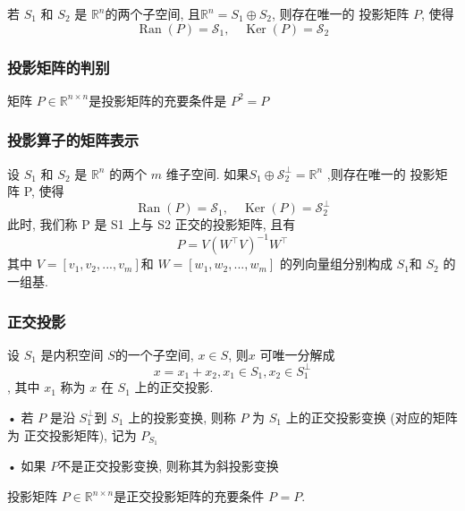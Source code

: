 \documentclass[12pt,a4paper]{article}
\begin{document}
\begin{framed}
	\begin{lemma}
		若 $S_1$ 和 $S_2$ 是 $\mathbb{R}^n$的两个子空间, 且$ \mathbb{R}^n= S_1 ⊕ S_2$, 则存在唯一的
		投影矩阵 $P$, 使得
		$$
		\operatorname{Ran}(P)=\mathcal{S}_{1}, \quad \operatorname{Ker}(P)=\mathcal{S}_{2}
		$$
	\end{lemma}
\end{framed}

\subsubsection{投影矩阵的判别}
\begin{framed}
	\begin{theorem}
		矩阵 $P ∈\mathbb{R}^{n×n}$是投影矩阵的充要条件是 $P^2=P$
	\end{theorem}
\end{framed}

\subsubsection{投影算子的矩阵表示}
设 $S_1$ 和 $S_2$ 是 $\mathbb{R}^n$ 的两个 $m$ 维子空间. 如果$S_{1} \oplus \mathcal{S}_{2}^{\perp}=\mathbb{R}^{n}$ ,则存在唯一的
投影矩阵 P, 使得
$$
\operatorname{Ran}(P)=\mathcal{S}_{1}, \quad \operatorname{Ker}(P)=\mathcal{S}_{2}^{\perp}
$$
此时, 我们称 P 是 S1 上与 S2 正交的投影矩阵, 且有
$$
P=V\left(W^{\top} V\right)^{-1} W^{\top}
$$
其中 $V = [v_1, v_2, . . . , v_m] $和 $W = [w_1, w_2, . . . , w_m]$ 的列向量组分别构成
$S_1 $和 $S_2$ 的一组基.

\subsubsection{正交投影}
设 $S_1$ 是内积空间 $S $的一个子空间, $x ∈ S$, 则$x$ 可唯一分解成
$$x = x_1 + x_2, x_1 ∈ S_1, x_2 ∈ S^{⊥}_1$$
,
其中 $x_1$ 称为 $x$ 在 $S_1$ 上的正交投影.

• 若 $P$ 是沿 $S^{⊥}_1 $到 $S_1$ 上的投影变换, 则称 $P$ 为 $S_1$ 上的正交投影变换
(对应的矩阵为 正交投影矩阵), 记为 $P_{S_1}$

• 如果 $P $不是正交投影变换, 则称其为斜投影变换

\begin{framed}
	\begin{theorem}
		投影矩阵 $P ∈\mathbb{R}^{n×n}$是正交投影矩阵的充要条件 $P^{} = P$.
	\end{theorem}
\end{framed}
\end{document}
